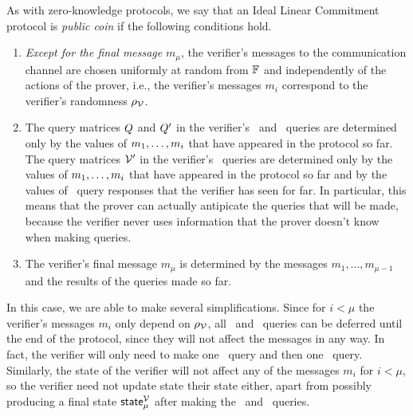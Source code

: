 As with zero-knowledge protocols, we say that an Ideal Linear Commitment protocol is \emph{public coin} if the following conditions hold.
\begin{enumerate}
\item \emph{Except for the final message} $m_\mu$, the verifier's messages to the communication channel are chosen uniformly at random from $\mathbb{F}$ and independently of the actions of the prover, i.e., the verifier's messages $m_i$ correspond to the verifier's randomness $\rho_{\mathcal{V}}$.
\item The query matrices $Q$ and $Q'$ in the verifier's \ILCopen\ and \ILCcheck\ queries are determined only by the values of $m_1,\ldots,m_i$ that have appeared in the protocol so far. The query matrices $\mathcal{V}'$ in the verifier's \ILCcheck\ queries are determined only by the values of $m_1,\ldots,m_i$ that have appeared in the protocol so far and by the values of \ILCopen\ query responses that the verifier has seen for far. In particular, this means that the prover can actually antipicate the queries that will be made, because the verifier never uses information that the prover doesn't know when making queries.
\item The verifier's final message $m_\mu$ is determined by the messages $m_1,\ldots,m_{\mu-1}$ and the results of the queries made so far.
\end{enumerate}
%
In this case, we are able to make several simplifications. Since for $i < \mu$ the verifier's messages $m_i$ only depend on $\rho_{\mathcal{V}}$, all \ILCopen\ and \ILCcheck\ queries can be deferred until the end of the protocol, since they will not affect the messages in any way. In fact, the verifier will only need to make one \ILCopen\ query and then one \ILCcheck\ query. Similarly, the state of the verifier will not affect any of the messages $m_i$ for $i < \mu$, so the verifier need not update state their state either, apart from possibly producing a final state $\mathsf{state}^{\mathcal{V}}_\mu$ after making the \ILCopen\ and \ILCcheck\ queries.

